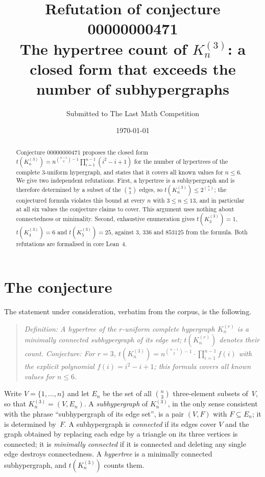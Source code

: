 \documentclass[11pt]{article}
\title{Refutation of conjecture 00000000471\\[2mm]
\large The hypertree count of $K_n^{(3)}$: a closed form that exceeds the
number of subhypergraphs}
\author{Submitted to The Last Math Competition}
\date{\today}
\theoremstyle{remark}
\begin{document}
\maketitle

\begin{abstract}
\noindent
Conjecture 00000000471 proposes the closed form
$t(K_n^{(3)}) = n^{\binom{n-1}{2}-1}\prod_{i=1}^{n-1}(i^2-i+1)$ for the number of
hypertrees of the complete $3$-uniform hypergraph, and states that it covers all
known values for $n \le 6$. We give two independent refutations. First, a
hypertree is a subhypergraph and is therefore determined by a subset of the
$\binom{n}{3}$ edges, so $t(K_n^{(3)}) \le 2^{\binom{n}{3}}$; the conjectured
formula violates this bound at every $n$ with $3 \le n \le 13$, and in particular
at all six values the conjecture claims to cover. This argument uses nothing
about connectedness or minimality. Second, exhaustive enumeration gives
$t(K_3^{(3)}) = 1$, $t(K_4^{(3)}) = 6$ and $t(K_5^{(3)}) = 25$, against $3$,
$336$ and $853125$ from the formula. Both refutations are formalised in core
Lean~4.
\end{abstract}

\section{The conjecture}

The statement under consideration, verbatim from the corpus, is the following.

\begin{quote}
\emph{Definition: A hypertree of the $r$-uniform complete hypergraph
$K_n^{(r)}$ is a minimally connected subhypergraph of its edge set;
$t(K_n^{(r)})$ denotes their count. Conjecture: For $r = 3$,
$t(K_n^{(3)}) = n^{\binom{n-1}{2}-1}\cdot\prod_{i=1}^{n-1}f(i)$ with the
explicit polynomial $f(i) = i^2 - i + 1$; this formula covers all known values
for $n \le 6$.}
\end{quote}

Write $V = \{1,\dots,n\}$ and let $E_n$ be the set of all $\binom{n}{3}$
three-element subsets of~$V$, so that $K_n^{(3)} = (V, E_n)$. A
\emph{subhypergraph} of $K_n^{(3)}$, in the only sense consistent with the
phrase ``subhypergraph of its edge set'', is a pair $(V, F)$ with $F \subseteq
E_n$; it is determined by~$F$. A subhypergraph is \emph{connected} if its edges
cover $V$ and the graph obtained by replacing each edge by a triangle on its
three vertices is connected; it is \emph{minimally connected} if it is
connected and deleting any single edge destroys connectedness. A \emph{hypertree}
is a minimally connected subhypergraph, and $t(K_n^{(3)})$ counts them.
\end{document}

